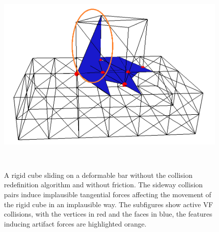 \begin{figure}[tbp]
\begin{minipage}[b]{0.3 \linewidth}
{			       \includegraphics[width=1.0\linewidth]{pics/png/redef_vf06wo.png} }
				\end{minipage}\\
				\caption[A rigid cube sliding on a deformable bar without the collision redefinition algorithm and without friction.]{A rigid cube sliding on a deformable bar without the collision redefinition algorithm and without friction. The sideway collision pairs induce implausible tangential forces affecting the movement of the rigid cube in an implausible way.  The subfigures show active VF collisions, with the vertices in red and the faces in blue, the features inducing artifact forces are highlighted orange.}
				\label{fig::redef_collsVFwo}
\end{figure}

